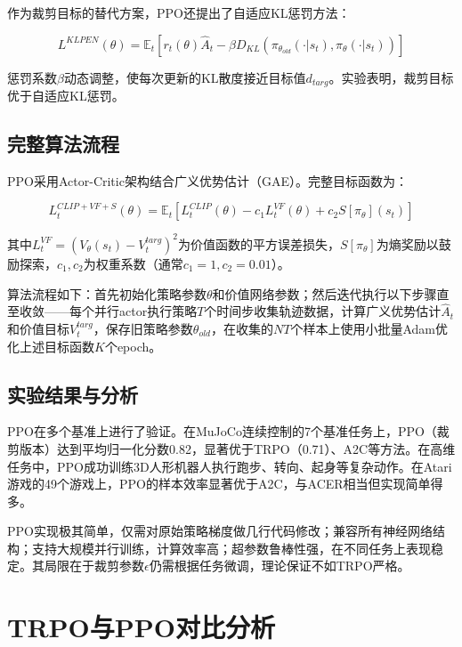 \documentclass[12pt,a4paper]{article}
\begin{document}
作为裁剪目标的替代方案，PPO还提出了自适应KL惩罚方法：

\begin{equation}
L^{KLPEN}(\theta) = \mathbb{E}_t\left[r_t(\theta)\hat{A}_t - \beta D_{KL}(\pi_{\theta_{old}}(\cdot|s_t),\pi_{\theta}(\cdot|s_t))\right]
\end{equation}

惩罚系数$\beta$动态调整，使每次更新的KL散度接近目标值$d_{targ}$。实验表明，裁剪目标优于自适应KL惩罚。

\subsection{完整算法流程}

PPO采用Actor-Critic架构结合广义优势估计（GAE）。完整目标函数为：

\begin{equation}
L_t^{CLIP+VF+S}(\theta) = \mathbb{E}_t\left[L_t^{CLIP}(\theta) - c_1 L_t^{VF}(\theta) + c_2 S[\pi_{\theta}](s_t)\right]
\end{equation}

其中$L_t^{VF}=(V_{\theta}(s_t)-V_t^{targ})^2$为价值函数的平方误差损失，$S[\pi_{\theta}]$为熵奖励以鼓励探索，$c_1,c_2$为权重系数（通常$c_1=1, c_2=0.01$）。

算法流程如下：首先初始化策略参数$\theta$和价值网络参数；然后迭代执行以下步骤直至收敛——每个并行actor执行策略$T$个时间步收集轨迹数据，计算广义优势估计$\hat{A}_t$和价值目标$V_t^{targ}$，保存旧策略参数$\theta_{old}$，在收集的$NT$个样本上使用小批量Adam优化上述目标函数$K$个epoch。

\subsection{实验结果与分析}

PPO在多个基准上进行了验证。在MuJoCo连续控制的7个基准任务上，PPO（裁剪版本）达到平均归一化分数0.82，显著优于TRPO（0.71）、A2C等方法。在高维任务中，PPO成功训练3D人形机器人执行跑步、转向、起身等复杂动作。在Atari游戏的49个游戏上，PPO的样本效率显著优于A2C，与ACER相当但实现简单得多。

PPO实现极其简单，仅需对原始策略梯度做几行代码修改；兼容所有神经网络结构；支持大规模并行训练，计算效率高；超参数鲁棒性强，在不同任务上表现稳定。其局限在于裁剪参数$\epsilon$仍需根据任务微调，理论保证不如TRPO严格。

\section{TRPO与PPO对比分析}
\end{document}
